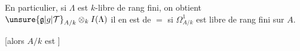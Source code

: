 En particulier, si $\Lambda$ est $k$-libre de rang fini, on obtient $\unsure{\mathfrak{g}|g|\mathcal{T}}_{A/k}\otimes_k I(\Lambda)$\unsure{;|,} il en est de $=$  si $\Omega^1_{A/k}$ est libre de rang fini sur $A$.

[alors $A/k$ est  ] 

